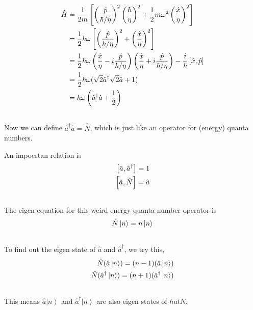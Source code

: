 \documentclass[letterpaper,10pt,english]{sphinxmanual}
\newcommand{\ket}[1]{\left| #1\right\rangle}
\begin{document}
\begin{gather}
\begin{split}\hat H & =  \frac{1}{2m} \left[ \left(\frac{\hat p}{\hbar/\eta}\right)^2 \left(\frac{\hbar}{\eta}\right)^2 + \frac{1}{2} m \omega^2 \left( \frac{\hat x}{\eta} \right)^2 \right] \\
& =  \frac 1 2 \hbar \omega \left[ \left(\frac{\hat p}{\hbar/\eta}\right)^2 + \left(\frac{\hat x}{\eta}\right)^2 \right]    \\
& =  \frac 1 2 \hbar \omega \left( \frac{\hat x}{\eta} - i \frac{\hat p}{\hbar/\eta}   \right) \left( \frac{\hat x}{\eta} + i\frac{\hat p}{\hbar/\eta}  \right)  - \frac{i}{\hbar} \left[\hat x, \hat p\right]    \\
& =  \frac 1 2 \hbar \omega (\sqrt 2 \hat a^\dagger \sqrt 2 \hat a + 1) \\
& =  \hbar \omega \left( \hat a^\dagger \hat a + \frac 1 2\right)\end{split}\notag\\\begin{split}\end{split}\notag
\end{gather}
Now we can define $\hat a^\dagger \hat a = \hat N$, which is just like an operator for (energy) quanta numbers.

An impoertan relation is
\begin{gather}
\begin{split}\left[\hat a, \hat a^\dagger\right] = 1 \\
\left[\hat a, \hat N\right] = \hat a\end{split}\notag\\\begin{split}\end{split}\notag
\end{gather}
The eigen equation for this weird energy quanta number operator is
\begin{gather}
\begin{split}\hat N \ket{n} = n \ket{n}\end{split}\notag\\\begin{split}\end{split}\notag
\end{gather}
To find out the eigen state of $\hat a$ and $\hat a^\dagger$, we try this,
\begin{gather}
\begin{split}\hat N (\hat a \ket{n}) = (n-1) (\hat a \ket{n})  \\
\hat N (\hat a^\dagger \ket{n}) = (n+1) (\hat a^\dagger \ket{n})\end{split}\notag\\\begin{split}\end{split}\notag
\end{gather}
This means $\hat a \ket{n}$ and $\hat a^\dagger \ket{n}$ are also eigen states of $hat N$.
\end{document}
